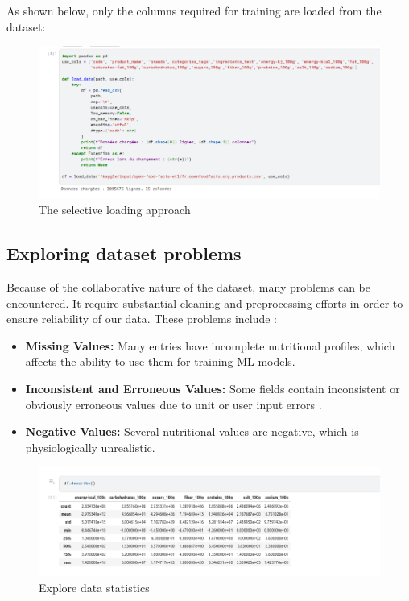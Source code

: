 \par As shown below, only the columns required for training are loaded from the dataset:

\begin{center}
\begin{figure}[H]
    \includegraphics[scale=0.44]{images/load_dataset.png}
    \caption{The selective loading approach} 
    \label{fig:load_dataset}
\end{figure}
\end{center}

\subsection{Exploring dataset problems}
Because of the collaborative nature of the dataset, many problems can be encountered. It require substantial cleaning and preprocessing efforts in order to ensure reliability of our data.
These problems include :
\begin{itemize}
\item \textbf{Missing Values:} Many entries have incomplete nutritional profiles, which affects the ability to use them for training ML models.
\item \textbf{Inconsistent and Erroneous Values:} Some fields contain inconsistent or obviously erroneous values due to unit or user input errors .

\item \textbf{Negative Values:} Several nutritional values are negative, which is physiologically unrealistic.
\end{itemize}

\begin{center}
\begin{figure}[H]
    \includegraphics[scale=0.55]{images/statistics.png}
    \caption{Explore data statistics} 
    \label{fig:data_statistics}
\end{figure}
\end{center}

